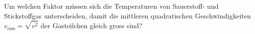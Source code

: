 Um welchen Faktor müssen sich die Temperaturen von Sauerstoff- und Stickstoffgas unterscheiden, damit die mittleren quadratischen Geschwindigkeiten $v_\text{rms} = \sqrt{\overline{v^2}}$ der Gasteilchen gleich gross sind?
